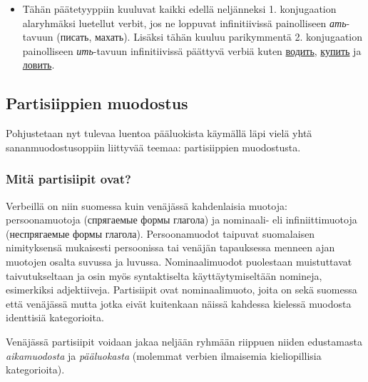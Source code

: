 \documentclass[]{scrartcl}
\providecommand{\tightlist}{%
  \setlength{\itemsep}{0pt}\setlength{\parskip}{0pt}}
\begin{document}
\begin{enumerate}
  \begin{itemize}
  \tightlist
  \item
    Tähän päätetyyppiin kuuluvat kaikki edellä neljänneksi 1.
    konjugaation alaryhmäksi luetellut verbit, jos ne loppuvat
    infinitiivissä painolliseen \emph{ать}-tavuun (писать, махать).
    Lisäksi tähän kuuluu parikymmentä 2. konjugaation painolliseen
    \emph{ить}-tavuun infinitiivissä päättyvä verbiä kuten
    \href{http://ru.wiktionary.org/wiki/водить}{водить},
    \href{http://ru.wiktionary.org/wiki/купить}{купить} ja
    \href{http://ru.wiktionary.org/wiki/ловить}{ловить}.
  \end{itemize}
\end{enumerate}

\subsection{Partisiippien muodostus}\label{partisiippien-muodostus}

Pohjustetaan nyt tulevaa luentoa pääluokista käymällä läpi vielä yhtä
sananmuodostusoppiin liittyvää teemaa: partisiippien muodostusta.

\subsubsection{Mitä partisiipit ovat?}\label{mituxe4-partisiipit-ovat}

Verbeillä on niin suomessa kuin venäjässä kahdenlaisia muotoja:
persoonamuotoja (спрягаемые формы глагола) ja nominaali- eli
infiniittimuotoja (неспрягаемые формы глагола). Persoonamuodot taipuvat
suomalaisen nimityksensä mukaisesti persoonissa tai venäjän tapauksessa
menneen ajan muotojen osalta suvussa ja luvussa. Nominaalimuodot
puolestaan muistuttavat taivutukseltaan ja osin myös syntaktiselta
käyttäytymiseltään nomineja, esimerkiksi adjektiiveja. Partisiipit ovat
nominaalimuoto, joita on sekä suomessa että venäjässä mutta jotka eivät
kuitenkaan näissä kahdessa kielessä muodosta identtisiä kategorioita.

Venäjässä partisiipit voidaan jakaa neljään ryhmään riippuen niiden
edustamasta \emph{aikamuodosta} ja \emph{pääluokasta} (molemmat verbien
ilmaisemia kieliopillisia kategorioita).
\end{document}
